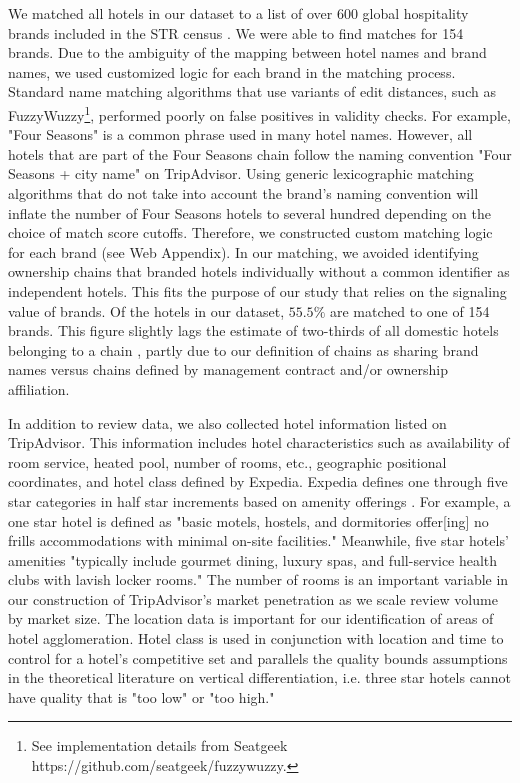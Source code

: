 \documentclass[mksc,blindrev]{informs3} %
\begin{document}
We matched all hotels in our dataset to a list of over 600 global hospitality brands included in the STR census \citep{hotelnews2015}. We were able to find matches for 154 brands. Due to the ambiguity of the mapping between hotel names and brand names, we used customized logic for each brand in the matching process. Standard name matching algorithms that use variants of edit distances, such as FuzzyWuzzy\footnote{See implementation details from Seatgeek https://github.com/seatgeek/fuzzywuzzy.}, performed poorly on false positives in validity checks. For example, "Four Seasons" is a common phrase used in many hotel names. However, all hotels that are part of the Four Seasons chain follow the naming convention "Four Seasons + city name" on TripAdvisor. Using generic lexicographic matching algorithms that do not take into account the brand's naming convention will inflate the number of Four Seasons hotels to several hundred depending on the choice of match score cutoffs. Therefore, we constructed custom matching logic for each brand (see Web Appendix). In our matching, we avoided identifying ownership chains that branded hotels individually without a common identifier as independent hotels. This fits the purpose of our study that relies on the signaling value of brands. Of the hotels in our dataset, $55.5\%$ are matched to one of 154 brands. This figure slightly lags the estimate of two-thirds of all domestic hotels belonging to a chain \citep{lodging2017}, partly due to our definition of chains as sharing brand names versus chains defined by management contract and/or ownership affiliation.

In addition to review data, we also collected hotel information listed on TripAdvisor. This information includes hotel characteristics such as availability of room service, heated pool, number of rooms, etc., geographic positional coordinates, and hotel class defined by Expedia. Expedia defines one through five star categories in half star increments based on amenity offerings \citep{expedia2018ratings}. For example, a one star hotel is defined as "basic motels, hostels, and dormitories offer[ing] no frills accommodations with minimal on-site facilities." Meanwhile, five star hotels' amenities "typically include gourmet dining, luxury spas, and full-service health clubs with lavish locker rooms." The number of rooms is an important variable in our construction of TripAdvisor's market penetration as we scale review volume by market size. The location data is important for our identification of areas of hotel agglomeration. Hotel class is used in conjunction with location and time to control for a hotel's competitive set and parallels the quality bounds assumptions in the theoretical literature on vertical differentiation, i.e. three star hotels cannot have quality that is "too low" or "too high."
\end{document}
